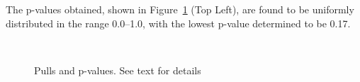 The p-values obtained, shown in Figure~\ref{fig:fluct} (Top
Left), are found to be uniformly distributed in the range 0.0--1.0,
with the lowest p-value determined to be 0.17.

%
\begin{figure}[h!]
  \begin{center}
     \\
    \caption{Pulls and p-values. See text for details}
    \label{fig:fluct}
  \end{center}
\end{figure}

